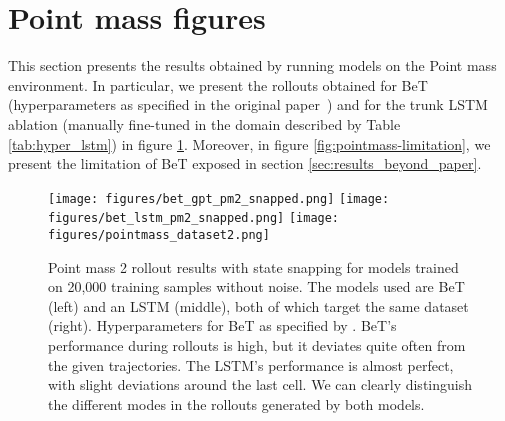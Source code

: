 \section{Point mass figures}\label{app:point-mass-figures}

This section presents the results obtained by running models on the Point mass environment.
In particular, we present the rollouts obtained for BeT (hyperparameters as specified in the original paper~\cite{shafiullah2022behavior}) and for the trunk LSTM ablation (manually fine-tuned in the domain described by Table \ref{tab:hyper_lstm}) in figure \ref{fig:pointmass-results}.
Moreover, in figure \ref{fig:pointmass-limitation}, we present the limitation of BeT exposed in section \ref{sec:results_beyond_paper}.

\begin{table}[htb]
\centering
\caption{Unlike the original work, where the LSTM suffered from training collapse,
we find that using a two-layer LSTM trunk is a robust alternative to using a transformer decoder.
Hyperparameters for the LSTM model were tuned manually instead of using automated search algorithms
on the Point mass environment. The best hyperparameters are in bold.}
\label{tab:hyper_lstm}
\end{table}

\begin{figure}[htb]
\texttt{[image: figures/bet\_gpt\_pm2\_snapped.png]}
\texttt{[image: figures/bet\_lstm\_pm2\_snapped.png]}
\texttt{[image: figures/pointmass\_dataset2.png]}
\centering
\caption{Point mass 2 rollout results with state snapping for models trained on 20,000 training samples without noise.
The models used are BeT (left) and an LSTM (middle), both of which target the same dataset (right).
Hyperparameters for BeT as specified by \citet{shafiullah2022behavior}.
BeT's performance during rollouts is high, but it deviates quite often from the given trajectories.
The LSTM's performance is almost perfect, with slight deviations around the last cell.
We can clearly distinguish the different modes in the rollouts generated by both models.
}
\label{fig:pointmass-results}
\end{figure}

